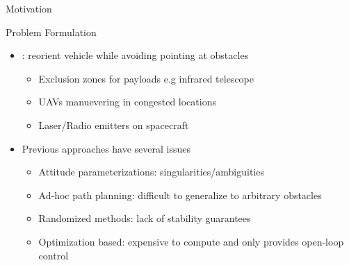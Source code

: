 \begin{frame}[t]{Motivation}
{\begin{figure}
\begin{subfigure}[b]{0.5\textwidth}
    \end{subfigure}
\end{figure}
}
\end{frame}   %


\begin{frame}[t]{Problem Formulation} %
\begin{itemize}
    \item {} : reorient vehicle while avoiding pointing at obstacles
    \begin{itemize}
        \item Exclusion zones for payloads e.g infrared telescope
        \item UAVs manuevering in congested locations
        \item Laser/Radio emitters on spacecraft
    \end{itemize}
    \pause
    \vs
    \item Previous approaches have several issues
    \begin{itemize}
        \item Attitude parameterizations: singularities/ambiguities
        \item Ad-hoc path planning: difficult to generalize to arbitrary obstacles
        \item Randomized methods: lack of stability guarantees
        \item Optimization based: expensive to compute and only provides open-loop control  
    \end{itemize}
\end{itemize}
\end{frame} %


